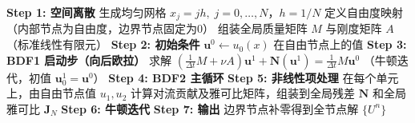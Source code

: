 \documentclass{GZUbachelorthesis}
\theoremstyle{chineseplain}
\begin{document}
\begin{algorithm}
	\caption{BDF2-P1 格式求解非线性方程}
	\label{alg:BDF2-P1-nonlinear-simple}
	\BlankLine
	\textbf{Step 1: 空间离散}\;
	生成均匀网格 $x_j = jh,\; j=0,\dots,N$，$h=1/N$\;
	定义自由度映射（内部节点为自由度，边界节点固定为0）\;
	组装全局质量矩阵 $M$ 与刚度矩阵 $A$（标准线性有限元）\;
	\BlankLine
	\textbf{Step 2: 初始条件}\;
	$\mathbf{u}^0 \gets u_0(x)$ 在自由节点上的值\;
	\BlankLine
	\textbf{Step 3: BDF1 启动步（向后欧拉）}\;
	求解 $\left(\frac{1}{\Delta t}M + \nu A\right)\mathbf{u}^1 + \mathbf{N}(\mathbf{u}^1) = \frac{1}{\Delta t}M\mathbf{u}^0$\;
	（牛顿迭代，初值 $\mathbf{u}^1_0 = \mathbf{u}^0$）\;
	\BlankLine
	\textbf{Step 4: BDF2 主循环}\;
	\BlankLine
	\textbf{Step 5: 非线性项处理}\;
	在每个单元上，由自由节点值 $u_1, u_2$ 计算对流贡献及雅可比矩阵，组装到全局残差 $\mathbf{N}$ 和全局雅可比 $\mathbf{J}_N$\;
	\BlankLine
	\textbf{Step 6: 牛顿迭代}\;
	\BlankLine
	\textbf{Step 7: 输出}\;
	边界节点补零得到全节点解 $\{U^n\}$\;
\end{algorithm}
%
%
\end{document}
